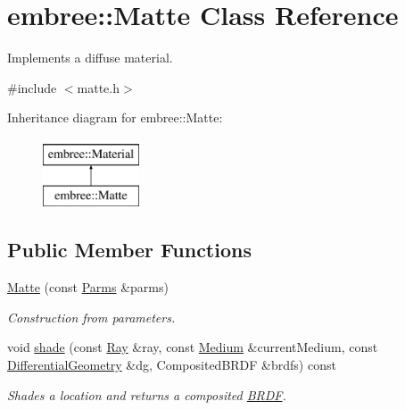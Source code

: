 \hypertarget{classembree_1_1_matte}{
\section{embree::Matte Class Reference}
\label{classembree_1_1_matte}
}


Implements a diffuse material.  




{\ttfamily \#include $<$matte.h$>$}

Inheritance diagram for embree::Matte:\begin{figure}[H]
\begin{center}
\leavevmode
\includegraphics[height=2.000000cm]{classembree_1_1_matte}
\end{center}
\end{figure}
\subsection*{Public Member Functions}
\begin{DoxyCompactItemize}
\item 
\hyperlink{classembree_1_1_matte_aced399a52464d69fa86099a79d7b0d24}{Matte} (const \hyperlink{classembree_1_1_parms}{Parms} \&parms)
\begin{DoxyCompactList}\small\item\em Construction from parameters. \item\end{DoxyCompactList}\item 
\hypertarget{classembree_1_1_matte_a7f0c79d7b1010957bd2045e3ea5c0207}{
void \hyperlink{classembree_1_1_matte_a7f0c79d7b1010957bd2045e3ea5c0207}{shade} (const \hyperlink{structembree_1_1_ray}{Ray} \&ray, const \hyperlink{classembree_1_1_medium}{Medium} \&currentMedium, const \hyperlink{structembree_1_1_differential_geometry}{DifferentialGeometry} \&dg, CompositedBRDF \&brdfs) const }
\label{classembree_1_1_matte_a7f0c79d7b1010957bd2045e3ea5c0207}

\begin{DoxyCompactList}\small\item\em Shades a location and returns a composited \hyperlink{classembree_1_1_b_r_d_f}{BRDF}. \item\end{DoxyCompactList}\end{DoxyCompactItemize}


